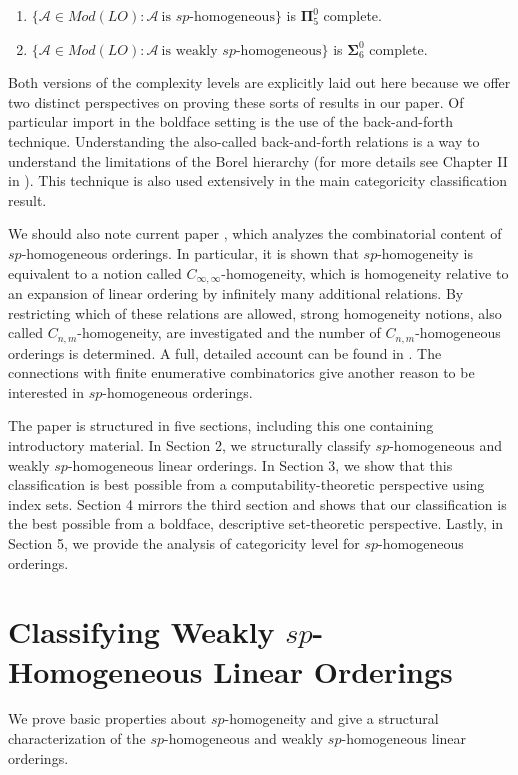 \documentclass[11pt]{amsart}
\theoremstyle{definition}
\def\A{\mathcal A}
\begin{document}
\begin{theorem}
\begin{enumerate}
    \item $\{\A\in Mod(LO): \A\ \text{is $sp$-homogeneous}\}$ is $\mathbf{\Pi}^0_5$ complete.
    \item $\{\A\in Mod(LO): \A \ \text{is weakly $sp$-homogeneous}\}$ is $\mathbf{\Sigma}^0_6$ complete.  
\end{enumerate}
\end{theorem}
\noindent Both versions of the complexity levels are explicitly laid out here because we offer two distinct perspectives on proving these sorts of results in our paper.
Of particular import in the boldface setting is the use of the back-and-forth technique.
Understanding the also-called back-and-forth relations is a way to understand the limitations of the Borel hierarchy (for more details see Chapter II in \cite{cst2}). This technique is also used extensively in the main categoricity classification result.

We should also note current paper \cite{GComb}, which analyzes the combinatorial content of $sp$-homogeneous orderings.
In particular, it is shown that $sp$-homogeneity is equivalent to a notion called $C_{\infty,\infty}$-homogeneity, which is homogeneity relative to an expansion of linear ordering by infinitely many additional relations.
By restricting which of these relations are allowed, strong homogeneity notions, also called $C_{n,m}$-homogeneity, are investigated and the number of $C_{n,m}$-homogeneous orderings is determined.
A full, detailed account can be found in \cite{GComb}.
The connections with finite enumerative combinatorics give another reason to be interested in $sp$-homogeneous orderings.

The paper is structured in five sections, including this one containing introductory material.
In Section 2, we structurally classify $sp$-homogeneous and weakly $sp$-homogeneous linear orderings.
In Section 3, we show that this classification is best possible from a computability-theoretic perspective using index sets.
Section 4 mirrors the third section and shows that our classification is the best possible from a boldface, descriptive set-theoretic perspective.
Lastly, in Section 5, we provide the analysis of categoricity level for $sp$-homogeneous orderings.


\section{Classifying Weakly $sp$-Homogeneous Linear Orderings}
We prove basic properties about $sp$-homogeneity and give a structural characterization of the $sp$-homogeneous and weakly $sp$-homogeneous linear orderings.
\end{document}
